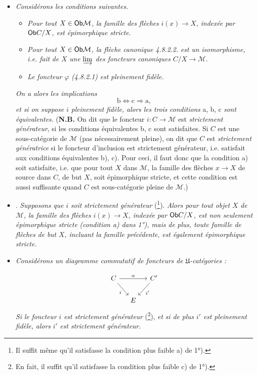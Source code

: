 \begin{itemize}[label={}]
\item[\textit{1°)}] \textit{Considérons les conditions suivantes.}
\begin{itemize}[label={}]
\item[\circled{a}] \textit{Pour tout $X \in \mathsf{Ob} \mathcal{M}$, la famille des flèches $i(x) \longrightarrow X$, indexée par $\mathsf{Ob} C/X$, est épimorphique stricte.}

\item[\circled{b}] \textit{Pour tout $X \in \mathsf{Ob} \mathcal{M}$, la flèche canonique 4.8.2.2. est un isomorphisme, i.e. fait de $X$ une $\varinjlim$ des foncteurs canoniques $C/X \longrightarrow \mathcal{M}$.}
\item[\circled{c}] \textit{Le foncteur $\varphi$ (4.8.2.1) est pleinement fidèle.}
\end{itemize}
\textit{On a alors les implications}
\[ \mathrm{b} \Longleftrightarrow \mathrm{c} \Longrightarrow \mathrm{a} , \]
\textit{et si on suppose $i$ pleinement fidèle, alors les trois conditions} a, b, c \textit{sont équivalentes.} (\textbf{N.B.} On dit que le foncteur $i : C \longrightarrow \mathcal{M}$ est \textit{strictement générateur}, si les conditions équivalentes b, c sont satisfaites. Si $C$ est une sous-catégorie de $\mathcal{M}$ (pas
nécessairement pleine), on dit que $C$ est \textit{strictement génératrice} si le foncteur d'inclusion est strictement générateur, i.e. satisfait aux conditions équivalentes b), c). Pour ceci, il faut donc que la condition a) soit satisfaite, i.e. que pour tout $X$ dans $\mathcal{M}$, la famille des flèches $x \longrightarrow X$ de source dans $C$, de but $X$, soit épimorphique stricte, et cette condition est aussi suffisante quand $C$ est sous-catégorie pleine de $\mathcal{M}$.)
\item[\textit{2°)}] . \textit{Supposons que $i$ soit strictement générateur} (\footnote[81]{Il suffit même qu'il satisfasse la condition plus faible a) de 1°).}). \textit{Alors pour tout objet $X$ de $\mathcal{M}$, la famille des flèches $i(x) \longrightarrow X$, indexée par $\mathsf{Ob} C/X$, est non seulement épimorphique stricte (condition a) dans 1°), mais de plus, toute famille de flèches de but $X$, incluant la famille précédente, est également épimorphique stricte.}
\item[\textit{3°)}] \textit{Considérons un diagramme commutatif de foncteurs de $\mathfrak{U}$-catégories :}

\[ \begin{tikzcd}[column sep=small]
C \arrow[rr, "\alpha"] \arrow[dr, "i"'] & & C' \arrow[dl, "i'"] \\
& E &
\end{tikzcd} \]
\textit{Si le foncteur $i$ est strictement générateur} (\footnote[82]{En fait, il suffit qu'il satisfasse la condition plus faible c) de 1°).}), \textit{et si de plus $i'$ est pleinement fidèle, alors $i'$ est strictement générateur.}
\end{itemize}

